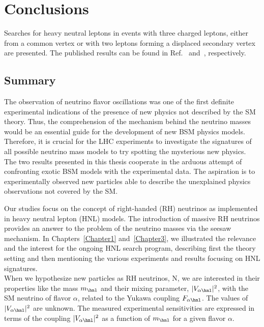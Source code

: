 
\chapter{Conclusions}\label{Chapter7} 

Searches for heavy neutral leptons in events with three charged
leptons, either from a common vertex or with two leptons forming a
displaced secondary vertex are presented. The published
results can be found in Ref.~\cite{Sirunyan:2018mtv} and~\cite{CMS-PAS-EXO-20-009}, respectively.\\

\section{Summary}
The observation of neutrino flavor oscillations was one of the first 
definite experimental indications of the
presence of new physics not described by the SM theory. 
Thus, the comprehension of the mechanism behind the neutrino masses would be an essential guide for the development of new BSM physics models. Therefore, it is crucial for the LHC experiments to investigate the signatures of all possible neutrino mass models to try spotting the mysterious new physics.\\
The two results presented in this thesis cooperate in the arduous attempt of confronting exotic BSM
models with the experimental data. The aspiration is to experimentally
observed new particles able to describe the unexplained
physics observations not covered by the SM. 

Our studies focus on the concept of right-handed (RH) neutrinos as
implemented in heavy neutral lepton (HNL) models. The introduction of massive RH
neutrinos provides an answer to the problem of the
neutrino masses via the seesaw mechanism.  
In Chapters~\ref{Chapter1} and~\ref{Chapter3}, we illustrated
the relevance and the interest for the
ongoing HNL search program, describing first the theory setting 
and then mentioning the various experiments and results
focusing on HNL signatures.\\
When we hypothesize new particles as RH neutrinos, N, we
are interested in their properties like the mass $m_\hnl$ and
their mixing parameter, $|V_{\alpha \hnl}|^2$,  with the SM neutrino of flavor $\alpha$,
related to the Yukawa coupling $F_{\alpha \hnl}$. The values of $|V_{\alpha
  \hnl}|^2$ are unknown. The measured experimental
sensitivities are expressed in
terms of the coupling $|V_{\alpha \hnl}|^2$
as a function of $m_\hnl$ for a given flavor $\alpha$. 

